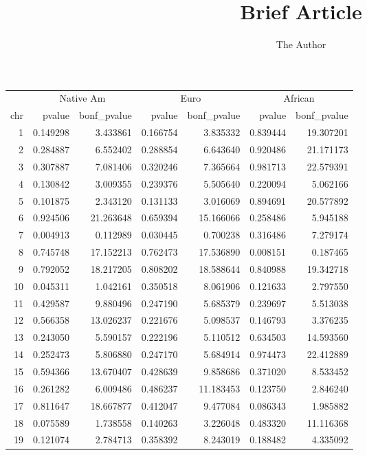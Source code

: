 \documentclass[11pt]{article} %
\title{Brief Article}
\author{The Author}
\begin{document}
\begin{table}[ht]
\begin{center}
\begin{tabular}{r|rr|rr|rr}
  \hline
&\multicolumn{2}{c|}{Native Am}&\multicolumn{2}{c|}{Euro}&\multicolumn{2}{c}{African}\\
chr & pvalue & bonf\_pvalue & pvalue & bonf\_pvalue & pvalue & bonf\_pvalue \\ 
  \hline
1 & 0.149298 & 3.433861 & 0.166754 & 3.835332 & 0.839444 & 19.307201 \\ 
  2 & 0.284887 & 6.552402 & 0.288854 & 6.643640 & 0.920486 & 21.171173 \\ 
  3 & 0.307887 & 7.081406 & 0.320246 & 7.365664 & 0.981713 & 22.579391 \\ 
  4 & 0.130842 & 3.009355 & 0.239376 & 5.505640 & 0.220094 & 5.062166 \\ 
  5 & 0.101875 & 2.343120 & 0.131133 & 3.016069 & 0.894691 & 20.577892 \\ 
  6 & 0.924506 & 21.263648 & 0.659394 & 15.166066 & 0.258486 & 5.945188 \\ 
  7 & 0.004913 & 0.112989 & 0.030445 & 0.700238 & 0.316486 & 7.279174 \\ 
  8 & 0.745748 & 17.152213 & 0.762473 & 17.536890 & 0.008151 & 0.187465 \\ 
  9 & 0.792052 & 18.217205 & 0.808202 & 18.588644 & 0.840988 & 19.342718 \\ 
  10 & 0.045311 & 1.042161 & 0.350518 & 8.061906 & 0.121633 & 2.797550 \\ 
  11 & 0.429587 & 9.880496 & 0.247190 & 5.685379 & 0.239697 & 5.513038 \\ 
  12 & 0.566358 & 13.026237 & 0.221676 & 5.098537 & 0.146793 & 3.376235 \\ 
  13 & 0.243050 & 5.590157 & 0.222196 & 5.110512 & 0.634503 & 14.593560 \\ 
  14 & 0.252473 & 5.806880 & 0.247170 & 5.684914 & 0.974473 & 22.412889 \\ 
  15 & 0.594366 & 13.670407 & 0.428639 & 9.858686 & 0.371020 & 8.533452 \\ 
  16 & 0.261282 & 6.009486 & 0.486237 & 11.183453 & 0.123750 & 2.846240 \\ 
  17 & 0.811647 & 18.667877 & 0.412047 & 9.477084 & 0.086343 & 1.985882 \\ 
  18 & 0.075589 & 1.738558 & 0.140263 & 3.226048 & 0.483320 & 11.116368 \\ 
  19 & 0.121074 & 2.784713 & 0.358392 & 8.243019 & 0.188482 & 4.335092 \\ 

\end{tabular}
\end{center}
\end{table}
\end{document}
